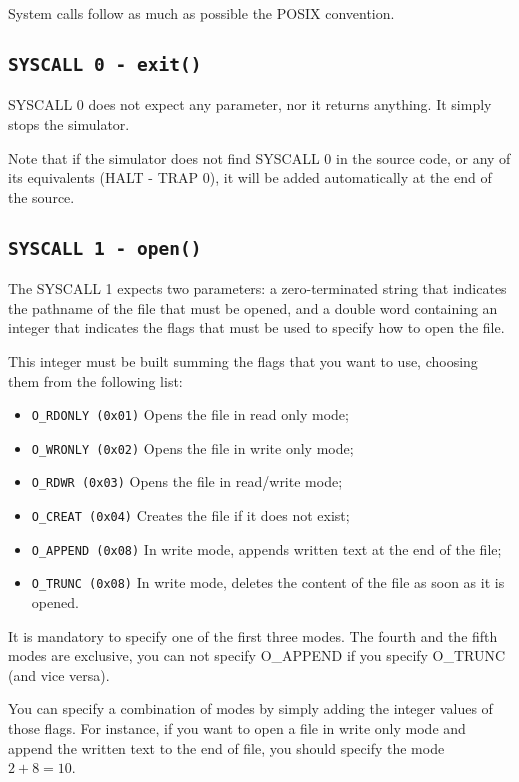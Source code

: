 \documentclass[12pt]{report}
\begin{document}
System calls follow as much as possible the POSIX convention.

\subsection{\texttt{SYSCALL 0 - exit()}}
SYSCALL 0 does not expect any parameter, nor it returns anything. It simply stops
the simulator.

Note that if the simulator does not find SYSCALL 0 in the source code, or any of
its equivalents (HALT - TRAP 0), it will be added automatically at the end of
the source.

\subsection{\texttt{SYSCALL 1 - open()}}
The SYSCALL 1 expects two parameters: a zero-terminated string that indicates
the pathname of the file that must be opened, and a double word containing an
integer that indicates the flags that must be used to specify how to open the
file.

This integer must be built summing the flags that you want to use, choosing them
from the following list:
\begin{itemize}
	\item \texttt{O\_RDONLY (0x01)} Opens the file in read only mode;
	\item \texttt{O\_WRONLY (0x02)} Opens the file in write only mode;
	\item \texttt{O\_RDWR (0x03)} Opens the file in read/write mode;
	\item \texttt{O\_CREAT (0x04)} Creates the file if it does not exist;
	\item \texttt{O\_APPEND (0x08)} In write mode, appends written text at the end of the file;
	\item \texttt{O\_TRUNC (0x08)} In write mode, deletes the content of the file as soon as it is opened.
\end{itemize}

It is mandatory to specify one of the first three modes. The fourth and the
fifth modes are exclusive, you can not specify O\_APPEND if you specify O\_TRUNC
(and vice versa). 

You can specify a combination of modes by simply adding the integer values of
those flags. For instance, if you want to open a file in write only mode and
append the written text to the end of file, you should specify the mode $2 + 8 = 10$.
\end{document}
